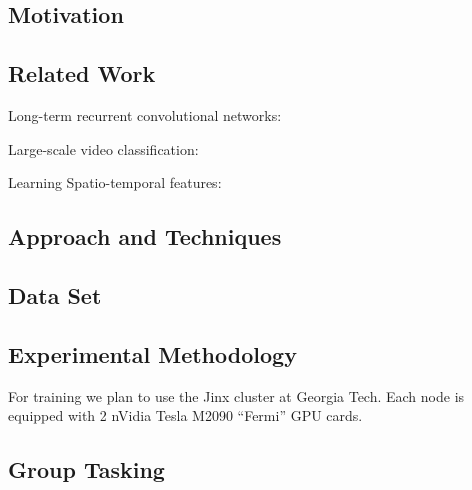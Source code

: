\subsection{Motivation}

\subsection{Related Work}



Long-term recurrent convolutional networks:~\cite{ltrcn}

Large-scale video classification:~\cite{cnnvid}

Learning Spatio-temporal features:~\cite{stf}
\subsection{Approach and Techniques}

\subsection{Data Set}

\subsection{Experimental Methodology}

For training we plan to use the Jinx cluster at Georgia Tech. Each node is equipped with 2 nVidia Tesla M2090 ``Fermi'' GPU cards.
\subsection{Group Tasking}

